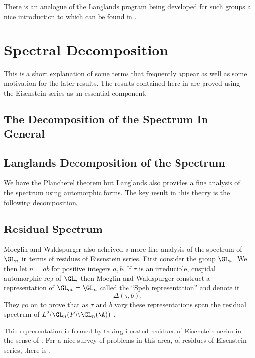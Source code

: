 There is an analogue of the Langlands program being developed for such groups a nice introduction to which can be found in \cite{ganLgroupsLanglandsProgram2017}. 








\section{Spectral Decomposition}\label{spectral_decomposition}
This is a short explanation of some terms that frequently appear as well as some motivation for the later results. The results contained here-in are proved using the Eisenstein series as an essential component. 

\subsection{The Decomposition of the Spectrum In General}\label{direct_integral}


\subsection{Langlands Decomposition of the Spectrum }
We have the Plancherel theorem but Langlands also provides a fine analysis of the spectrum using automorphic forms. The key result in this theory is the following decomposition,


\subsection{Residual Spectrum}\label{residual_spec}
Moeglin and Waldspurger also acheived a more fine analysis of the spectrum of \(\GL_n\) in terms of residues of Eisenstein series. 
First consider the group \(\GL_n\). We then let \(n = ab\) for positive integers \(a,b\). If \(\tau\) is an irreducible, cuspidal automorphic rep of \(\GL_a\) then Moeglin and Waldspurger construct a representation of \(\GL_{ab} = \GL_n\) called the ``Speh representation'' and denote it 
\[\Delta(\tau, b).\]
They go on to prove that as \(\tau\) and \(b\) vary these representations span the residual spectrum of \(L^2(\GL_n(F) \backslash \GL_n(\A))\) \cite[Thm. 1.1]{jiangPolesCertainResidual2013}.

This representation is formed by taking iterated residues of Eisenstein series in the sense of \cite[V]{moeglinSpectralDecompositionEisenstein1995}. For a nice survey of problems in this area, of residues of Eisenstein series, there is \cite{jiangResiduesEisensteinSeries2008a}.


